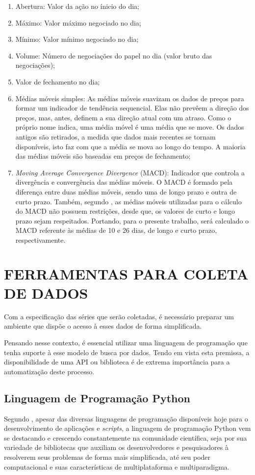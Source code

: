 \begin{enumerate}
\item Abertura: Valor da ação no ínicio do dia;
\item Máximo: Valor máximo negociado no dia;
\item Mínimo: Valor mínimo negociado no dia;
\item Volume: Número de negociações do papel no dia (valor bruto das negociações);
\item Valor de fechamento no dia;
\item Médias móveis simples: As médias móveis suavizam os dados de preços para formar um indicador de tendência sequencial. Elas não prevêem a direção dos preços, mas, antes, definem a sua direção atual com um atraso. Como o próprio nome indica, uma média móvel é uma média que se move. Os dados antigos são retirados, a medida que dados mais recentes se tornam disponíveis, isto faz com que a média se mova ao longo do tempo. A maioria das médias móveis são baseadas em preços de fechamento;
\item \textit{Moving Average Convergence Divergence} (MACD): Indicador que controla a divergência e convergência das médias móveis. O MACD é formado pela diferença entre duas médias móveis, sendo uma de longo prazo e outra de curto prazo. Também, segundo , as médias móveis utilizadas para o cálculo do MACD não possuem restrições, desde que, os valores de curto e longo prazo sejam respeitados. Portando, para o presente trabalho, será calculado o MACD referente às médias de 10 e 26 dias, de longo e curto prazo, respectivamente.
\end{enumerate}

\section{FERRAMENTAS PARA COLETA DE DADOS}
Com a especificação das séries que serão coletadas, é necessário preparar um ambiente que dispõe o acesso à esses dados de forma simplificada. 

Pensando nesse contexto, é essencial utilizar uma linguagem de programação que tenha suporte à esse modelo de busca por dados. Tendo em vista esta premissa, a disponibilidade de uma API ou biblioteca é de extrema importância para a automatização deste processo.

\subsection{Linguagem de Programação Python}
Segundo , apesar das diversas linguagens de programação disponíveis hoje para o desenvolvimento de aplicações e \textit{scripts}, a linguagem de programação Python vem se destacando e crescendo constantemente na comunidade científica, seja por sua variedade de bibliotecas que auxiliam os desenvolvedores e pesquisadores à resolverem seus problemas de forma mais simplificada, até seu poder computacional e suas características de multiplataforma e multiparadigma.


